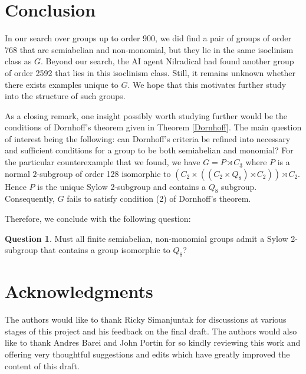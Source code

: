 \documentclass[11pt]{article}
\theoremstyle{definition}
\newtheorem{qst}[thm]{Question}
\numberwithin{equation}{section}
\begin{document}
\section{Conclusion}
\begin{humanblock}
In our search over groups up to order 900, we did find a pair of groups of order 768 that are semiabelian and non-monomial, but they lie in the same isoclinism class as $G$. Beyond our search, the AI agent Nilradical \cite{nilradical_v0_kourovka_21_68} had found another group of order 2592 that lies in this isoclinism class. Still, it remains unknown whether there exists examples unique to $G$. We hope that this motivates further study into the structure of such groups.

As a closing remark, one insight possibly worth studying further would be the conditions of Dornhoff's theorem given in Theorem \ref{Dornhoff}. The main question of interest being the following: can Dornhoff's criteria be refined into necessary and sufficient conditions for a group to be both semiabelian and monomial? For the particular counterexample that we found, we have $G = P \rtimes C_3$ where $P$ is a normal $2$-subgroup of order 128 isomorphic to $(C_2 \times ((C_2 \times Q_8) \rtimes C_2)) \rtimes C_2$. Hence $P$ is the unique Sylow 2-subgroup and contains a $Q_8$ subgroup. Consequently, $G$ fails to satisfy condition (2) of Dornhoff's theorem. 

Therefore, we conclude with the following question: 

\begin{qst}
    Must all finite semiabelian, non-monomial groups admit a Sylow 2-subgroup that contains a group isomorphic to $Q_8$? 
\end{qst}

 

\end{humanblock}


\section*{Acknowledgments}

The authors would like to thank Ricky Simanjuntak for discussions at various stages of this project and his feedback on the final draft. The authors would also like to thank Andres Barei and John Portin for so kindly reviewing this work and offering very thoughtful suggestions and edits which have greatly improved the content of this draft. 

\appendix 
\end{document}
